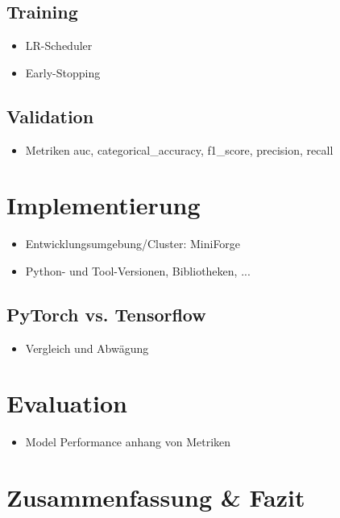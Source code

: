 \documentclass{article}
\begin{document}
    \subsection{Training}
    \begin{itemize}
        \item LR-Scheduler
        \item Early-Stopping
    \end{itemize}
    \subsection{Validation}
    \begin{itemize}
        \item Metriken auc, categorical\_accuracy, f1\_score, precision, recall
    \end{itemize}
    \section{Implementierung}
    \begin{itemize}
        \item Entwicklungsumgebung/Cluster: MiniForge
        \item Python- und Tool-Versionen, Bibliotheken, ...
    \end{itemize}
    \subsection{PyTorch vs. Tensorflow}
    \begin{itemize}
        \item Vergleich und Abwägung
    \end{itemize}
    \section{Evaluation}
    \begin{itemize}
        \item Model Performance anhang von Metriken
    \end{itemize}

    \section{Zusammenfassung \& Fazit}

    
    
\end{document}
